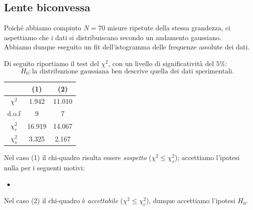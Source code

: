 \documentclass[a4paper]{article}
\begin{document}
    \subsection{Lente biconvessa}
    Poiché abbiamo compiuto $N=70$ misure ripetute della stessa grandezza, ci aspettiamo che i dati si distribuiscano secondo un andamento gaussiano. Abbiamo dunque eseguito un fit dell'istogramma delle frequenze assolute dei dati.
    \begin{figure}[H]%
    	\centering
    	\qquad
    \end{figure}
    Di seguito riportiamo il test del $\chi^2$, con un livello di significatività del $5\%$:
    \[
    H_0: \text{la distribuzione gaussiana ben descrive quella dei dati sperimentali.}
    \]
    \begin{table}[H]
    	\centering
    	\begin{tabular}{|c|c|c|}
    		\hline
    		 & (1) & (2) \\ \hline
    		$\chi^2$ & 1.942 & 11.010 \\
    		d.o.f & 9 & 7 \\
    		$\chi^2_c$ & 16.919 & 14.067 \\
    		$\chi^2_s$ & 3.325 & 2.167 \\ \hline
    	\end{tabular}
    	\label{tab:chi-quadro-biconvessa}
    \end{table}
    Nel caso (1) il chi-quadro risulta essere \textit{sospetto} ($\chi^2\leq\chi^2_s$); accettiamo l'ipotesi nulla per i seguenti motivi:
    \begin{itemize}
    	\item %
    \end{itemize}Nel caso (2) il chi-quadro è \textit{accettabile} ($\chi^2\leq\chi^2_c$), dunque accettiamo l'ipotesi $H_0$.
    
\end{document}
